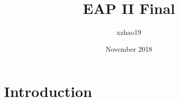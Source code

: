 \documentclass{article}
\title{EAP II Final}
\author{xzhao19 }
\date{November 2018}
\begin{document}
\maketitle

\section{Introduction}
\end{document}
